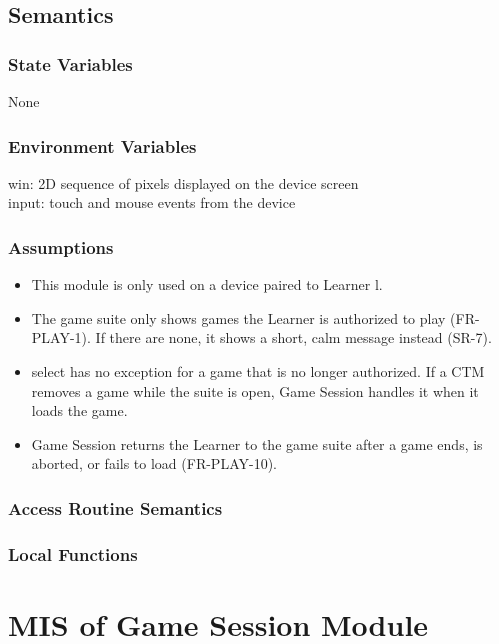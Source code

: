 \documentclass[12pt, titlepage]{article}
\begin{document}
\subsection{Semantics}

\subsubsection{State Variables}

None

\subsubsection{Environment Variables}

win: 2D sequence of pixels displayed on the device screen \\
input: touch and mouse events from the device

\subsubsection{Assumptions}

\begin{itemize}
\item This module is only used on a device paired to Learner l.
\item The game suite only shows games the Learner is authorized to play
  (FR-PLAY-1). If there are none, it shows a short, calm message instead
  (SR-7).
\item select has no exception for a game that is no longer authorized. If a CTM
  removes a game while the suite is open, Game Session handles it when it loads
  the game.
\item Game Session returns the Learner to the game suite after a game ends, is
  aborted, or fails to load (FR-PLAY-10).
\end{itemize}

\subsubsection{Access Routine Semantics}

\subsubsection{Local Functions}

\newpage

\section{MIS of Game Session Module} \label{mis:GameSession}
\end{document}
